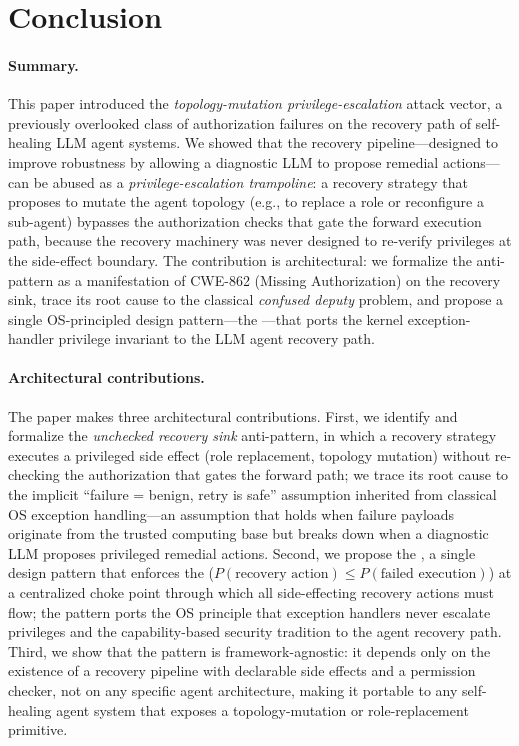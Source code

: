 
\section{Conclusion}
\label{sec:conclusion}

\paragraph{Summary.}
This paper introduced the \emph{topology-mutation privilege-escalation} attack vector, a previously overlooked class of authorization failures on the recovery path of self-healing LLM agent systems. We showed that the recovery pipeline---designed to improve robustness by allowing a diagnostic LLM to propose remedial actions---can be abused as a \emph{privilege-escalation trampoline}: a recovery strategy that proposes to mutate the agent topology (e.g., to replace a role or reconfigure a sub-agent) bypasses the authorization checks that gate the forward execution path, because the recovery machinery was never designed to re-verify privileges at the side-effect boundary. The contribution is architectural: we formalize the anti-pattern as a manifestation of CWE-862 (Missing Authorization) on the recovery sink, trace its root cause to the classical \emph{confused deputy} problem, and propose a single OS-principled design pattern---the \reauthgate{}---that ports the kernel exception-handler privilege invariant to the LLM agent recovery path.

\paragraph{Architectural contributions.}
The paper makes three architectural contributions. First, we identify and formalize the \emph{unchecked recovery sink} anti-pattern, in which a recovery strategy executes a privileged side effect (role replacement, topology mutation) without re-checking the authorization that gates the forward path; we trace its root cause to the implicit ``failure = benign, retry is safe'' assumption inherited from classical OS exception handling---an assumption that holds when failure payloads originate from the trusted computing base but breaks down when a diagnostic LLM proposes privileged remedial actions. Second, we propose the \reauthgate{}, a single design pattern that enforces the \privinv{} ($P(\text{recovery action}) \leq P(\text{failed execution})$) at a centralized choke point through which all side-effecting recovery actions must flow; the pattern ports the OS principle that exception handlers never escalate privileges and the capability-based security tradition to the agent recovery path. Third, we show that the pattern is framework-agnostic: it depends only on the existence of a recovery pipeline with declarable side effects and a permission checker, not on any specific agent architecture, making it portable to any self-healing agent system that exposes a topology-mutation or role-replacement primitive.

